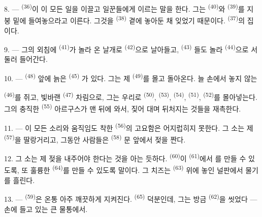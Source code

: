 \VUsaut{3.0mm}
\VUsaut{3.0mm}

8. ---  \textsuperscript{(36)}이 이 모든 일을 이끌고 일꾼들에게 이르는
말을 한다. 그는  \textsuperscript{(40)}와  \textsuperscript{(39)}를
지붕 밑에 들여놓으라고 이른다. 그것을  \textsuperscript{(38)} 곁에 놓아둔 채
잊었기 때문이다.  \textsuperscript{(37)}의 집이다.

9. --- 그의 외침에  \textsuperscript{(41)}가 놀라 온 날개로
 \textsuperscript{(42)}으로 날아들고,  \textsuperscript{(43)}
들도 놀라  \textsuperscript{(44)}으로 서둘러 들어간다.

10. ---  \textsuperscript{(48)} 앞에 늙은  \textsuperscript{(45)}
가 있다. 그는 제  \textsuperscript{(49)}를 몰고 돌아온다. 늘 손에서 놓지 않는

 \textsuperscript{(46)}를 쥐고, 빛바랜  \textsuperscript{(47)}
차림으로, 그는 우리로  \textsuperscript{(50)}, 
\textsuperscript{(53)},  \textsuperscript{(54)}, 
\textsuperscript{(51)},  \textsuperscript{(52)}를 몰아넣는다. 그의 충직한
 \textsuperscript{(55)} 아르구스가 맨 뒤에 와서, 짖어 대며 뒤처지는 것들을
재촉한다.

11. --- 이 모든 소리와 움직임도 착한  \textsuperscript{(56)}의 고요함은
어지럽히지 못한다. 그 소는 제  \textsuperscript{(57)}을 딸랑거리고, 그동안
사람들은  \textsuperscript{(58)} 문 앞에서 젖을 짠다.

12. 그 소는 제 젖을 내주어야 한다는 것을 아는 듯하다. 
\textsuperscript{(60)}이  \textsuperscript{(61)}에서 를
만들 수 있도록, 또 훌륭한  \textsuperscript{(64)}를 만들 수 있도록 말이다. 그
치즈는  \textsuperscript{(63)} 위에 놓인 널판에서 물기를 흘린다.

13. ---  \textsuperscript{(59)}은 온통 아주 깨끗하게 지켜진다.
 \textsuperscript{(65)} 덕분인데, 그는 방금 
\textsuperscript{(62)}을 씻었다 — 손에 들고 있는 큰 물통에서.

\VUsaut{3.0mm}
\VUsaut{3.0mm}

